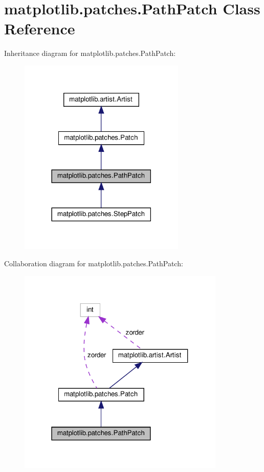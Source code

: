 \hypertarget{classmatplotlib_1_1patches_1_1PathPatch}{}\section{matplotlib.\+patches.\+Path\+Patch Class Reference}
\label{classmatplotlib_1_1patches_1_1PathPatch}


Inheritance diagram for matplotlib.\+patches.\+Path\+Patch\+:
\nopagebreak
\begin{figure}[H]
\begin{center}
\leavevmode
\includegraphics[width=225pt]{classmatplotlib_1_1patches_1_1PathPatch__inherit__graph}
\end{center}
\end{figure}


Collaboration diagram for matplotlib.\+patches.\+Path\+Patch\+:
\nopagebreak
\begin{figure}[H]
\begin{center}
\leavevmode
\includegraphics[width=280pt]{classmatplotlib_1_1patches_1_1PathPatch__coll__graph}
\end{center}
\end{figure}
